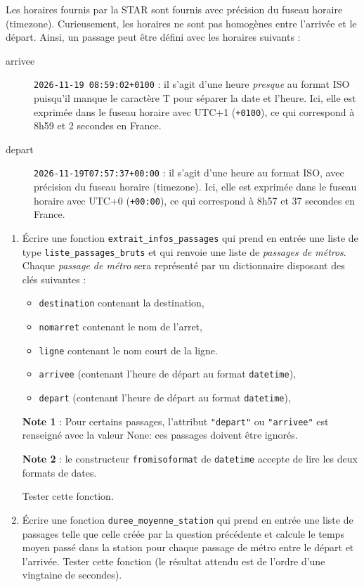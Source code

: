 \documentclass[11pt,a4paper]{article}
\begin{document}
Les horaires fournis par la STAR sont fournis avec précision du fuseau horaire (timezone). Curieusement, les horaires ne sont pas homogènes entre l'arrivée et le départ.
Ainsi, un passage peut être défini avec les horaires suivants : 
\begin{description}
    \item[arrivee] \verb'2026-11-19 08:59:02+0100' : il s'agit d'une heure \emph{presque} au format ISO puisqu'il manque le caractère T pour séparer la date et l'heure. Ici, elle est exprimée dans le fuseau horaire avec UTC+1 (\verb'+0100'), ce qui correspond à 8h59 et 2 secondes en France.
    \item[depart] \verb'2026-11-19T07:57:37+00:00' : il s'agit d'une heure au format ISO, avec précision du fuseau horaire (timezone). Ici, elle est exprimée dans le fuseau horaire avec UTC+0 (\verb'+00:00'), ce qui correspond à 8h57 et 37 secondes en France.

\end{description}


\begin{enumerate}
    \item Écrire une fonction \verb+extrait_infos_passages+ qui prend en entrée une liste de type \verb+liste_passages_bruts+ et qui renvoie une liste de \emph{passages de métros}. Chaque \emph{passage de métro} sera représenté par un dictionnaire disposant des clés suivantes : 
    
    \begin{itemize}
        \item \verb+destination+ contenant la destination,
        \item \verb+nomarret+ contenant le nom de l'arret,
        \item \verb+ligne+ contenant le nom court de la ligne.
        \item \verb+arrivee+ (contenant l'heure de départ au format \verb+datetime+), 
        \item \verb+depart+ (contenant l'heure de départ au format \verb+datetime+), 
        
    \end{itemize}
        \textbf{Note 1} : Pour certains passages, l'attribut \verb+"depart"+ ou \verb+"arrivee"+ est renseigné avec la valeur None: ces passages doivent être ignorés.

        \textbf{Note 2} : le constructeur \verb+fromisoformat+ de \verb+datetime+ accepte de lire les deux formats de dates.
    
        Tester cette fonction.
    \item Écrire une fonction \verb+duree_moyenne_station+ qui prend en entrée une liste de passages telle que celle créée par la question 
    précédente et calcule le temps moyen passé dans la station pour chaque passage de métro entre le départ et l'arrivée.  Tester cette fonction (le résultat attendu est de l'ordre d'une vingtaine de secondes).
\end{enumerate}
\end{document}
